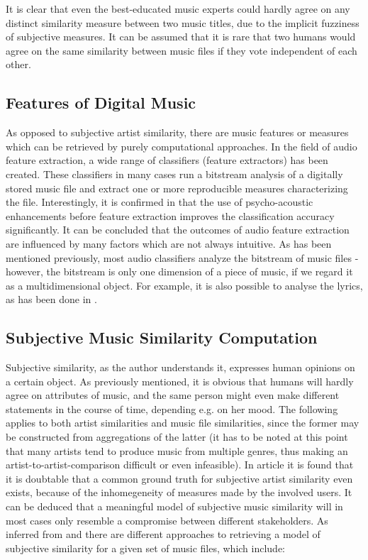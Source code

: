 It is clear that even the best-educated music experts could hardly agree on 
any distinct similarity measure between two music titles, due to the implicit fuzziness of subjective measures.
It can be assumed that it is rare that two humans would agree on the same similarity between music files
if they vote independent of each other.

\subsection{Features of Digital Music}

As opposed to subjective artist similarity, there are music features or measures which can be retrieved by
purely computational approaches. In the field of audio feature extraction, a wide range of classifiers
(feature extractors) has been created. These classifiers in many cases run a bitstream analysis of a digitally
stored music file and extract one or more reproducible measures characterizing the file. 
Interestingly, it is confirmed in \cite{LID_05ismir} that the use of psycho-acoustic enhancements before
feature extraction improves the classification accuracy significantly. It can be concluded that the outcomes of
audio feature extraction are influenced by many factors which are not always intuitive.
As has been mentioned previously, most audio classifiers analyze the bitstream of music files - however,
the bitstream is only one dimension of a piece of music, if we regard it as a multidimensional object. For example,
it is also possible to analyse the lyrics, as has been done in \cite{DBLP:conf/ismir/MayerNR08}.

\subsection{Subjective Music Similarity Computation}

Subjective similarity, as the author understands it, expresses human opinions on a certain object. As previously
mentioned, it is obvious that humans will hardly agree on attributes of music, and the same person might even make
different statements in the course of time, depending e.g. on her mood. The following applies to both artist 
similarities and music file similarities, since the former may be constructed from aggregations of the latter 
(it has to be noted at this point that many artists tend to produce music from multiple genres, thus making
an artist-to-artist-comparison difficult or even infeasible).
In article \cite{Ellis02thequest} it is found that it is doubtable that a common ground truth for subjective
artist similarity even exists, because of the inhomegeneity of measures made by the involved users. It can be
deduced that a meaningful model of subjective music similarity will in most cases only resemble a compromise
between different stakeholders.
As inferred from \cite{Berenzweig03alarge-scale} and \cite{mcfee09_hesas} there are different approaches to 
retrieving a model of subjective similarity for a given set of music files, which include:

